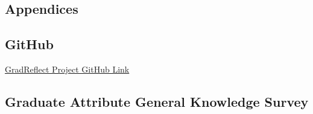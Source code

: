\documentclass{l4proj}
\begin{document}
%
% 

\begin{appendices}

\chapter{Appendices}







\section{GitHub}\label{AppendixGitHub}

\href{https://github.com/gmtmcd/Level-4-Individual-Project}{GradReflect Project GitHub Link}

\section{Graduate Attribute General Knowledge Survey} \label{Appendix-gradAttributeSurvey}





\end{appendices}






\end{document}
